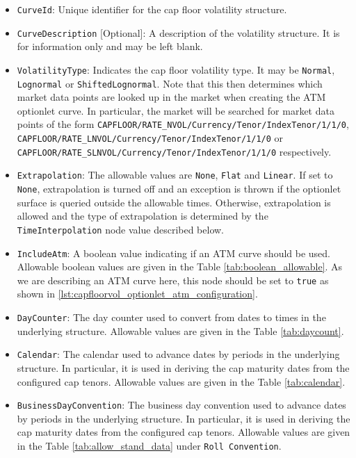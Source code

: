 \begin{itemize}
\item
\lstinline!CurveId!: Unique identifier for the cap floor volatility structure.

\item \lstinline!CurveDescription! [Optional]:
A description of the volatility structure. It is for information only and may be left blank.

\item \lstinline!VolatilityType!:
Indicates the cap floor volatility type. It may be \lstinline!Normal!, \lstinline!Lognormal! or \lstinline!ShiftedLognormal!. Note that this then determines which market data points are looked up in the market when creating the ATM optionlet curve. In particular, the market will be searched for market data points of the form \lstinline!CAPFLOOR/RATE_NVOL/Currency/Tenor/IndexTenor/1/1/0!, \lstinline!CAPFLOOR/RATE_LNVOL/Currency/Tenor/IndexTenor/1/1/0! or \lstinline!CAPFLOOR/RATE_SLNVOL/Currency/Tenor/IndexTenor/1/1/0! respectively.

\item \lstinline!Extrapolation!:
The allowable values are \lstinline!None!, \lstinline!Flat! and \lstinline!Linear!. If set to \lstinline!None!, extrapolation is turned off and an exception is thrown if the optionlet surface is queried outside the allowable times. Otherwise, extrapolation is allowed and the type of extrapolation is determined by the \lstinline!TimeInterpolation! node value described below.

\item \lstinline!IncludeAtm!:
A boolean value indicating if an ATM curve should be used. Allowable boolean values are given in the Table \ref{tab:boolean_allowable}. As we are describing an ATM curve here, this node should be set to \lstinline!true! as shown in \ref{lst:capfloorvol_optionlet_atm_configuration}.

\item \lstinline!DayCounter!:
The day counter used to convert from dates to times in the underlying structure. Allowable values are given in the Table \ref{tab:daycount}.

\item \lstinline!Calendar!:
The calendar used to advance dates by periods in the underlying structure. In particular, it is used in deriving the cap maturity dates from the configured cap tenors. Allowable values are given in the Table \ref{tab:calendar}.

\item \lstinline!BusinessDayConvention!:
The business day convention used to advance dates by periods in the underlying structure. In particular, it is used in deriving the cap maturity dates from the configured cap tenors. Allowable values are given in the Table \ref{tab:allow_stand_data} under \lstinline!Roll Convention!.


\end{itemize}
